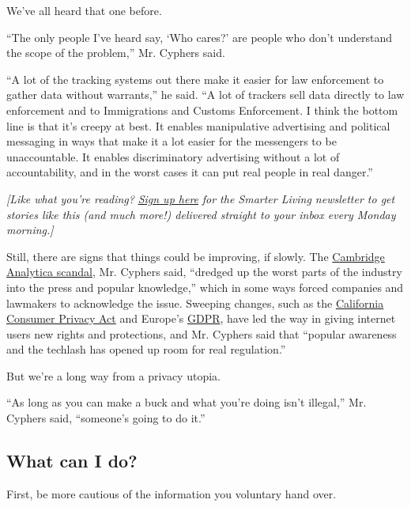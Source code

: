 We've all heard that one before.

``The only people I've heard say, `Who cares?' are people who don't
understand the scope of the problem,'' Mr. Cyphers said.

``A lot of the tracking systems out there make it easier for law
enforcement to gather data without warrants,'' he said. ``A lot of
trackers sell data directly to law enforcement and to Immigrations and
Customs Enforcement. I think the bottom line is that it's creepy at
best. It enables manipulative advertising and political messaging in
ways that make it a lot easier for the messengers to be unaccountable.
It enables discriminatory advertising without a lot of accountability,
and in the worst cases it can put real people in real danger.''

\emph{{[}Like what you're reading?}
\href{https://www.nytimes.com/newsletters/smarter-living?module=inline}{\emph{Sign
up here}} \emph{for the Smarter Living newsletter to get stories like
this (and much more!) delivered straight to your inbox every Monday
morning.{]}}

Still, there are signs that things could be improving, if slowly. The
\href{https://www.nytimes.com/2018/04/04/us/politics/cambridge-analytica-scandal-fallout.html}{Cambridge
Analytica scandal}, Mr. Cyphers said, ``dredged up the worst parts of
the industry into the press and popular knowledge,'' which in some ways
forced companies and lawmakers to acknowledge the issue. Sweeping
changes, such as the
\href{https://www.nytimes.com/2018/06/28/technology/california-online-privacy-law.html?module=inline}{California
Consumer Privacy Act} and Europe's
\href{https://www.nytimes.com/2018/05/24/technology/europe-gdpr-privacy.html}{GDPR},
have led the way in giving internet users new rights and protections,
and Mr. Cyphers said that ``popular awareness and the techlash has
opened up room for real regulation.''

But we're a long way from a privacy utopia.

``As long as you can make a buck and what you're doing isn't illegal,''
Mr. Cyphers said, ``someone's going to do it.''

\hypertarget{what-can-i-do}{%
\subsection{What can I do?}\label{what-can-i-do}}

First, be more cautious of the information you voluntary hand over.

